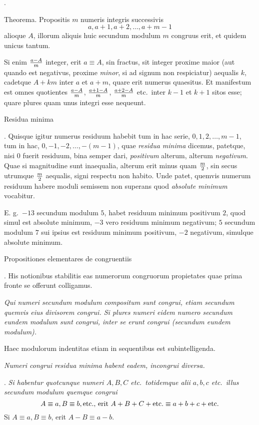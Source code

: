 .

\proclaim Theorema. Propositis $m$ numeris integris successivis
$$ a, a+1, a+2, \ldots, a+m-1$$
alioque $A$, illorum aliquis huic secundum modulum $m$ congruus erit, et quidem unicus tantum.

Si enim ${a-A\over m}$ integer, erit $a\equiv A$, sin fractus, sit integer proxime maior (aut quando est negativus, proxime {\it minor}, si ad signum non respiciatur) aequalis $k$, cadetque $A+km$ inter $a$ et $a+m$, quare erit numerus quaesitus. Et manifestum est omnes quotientes ${a-A \over m}$, ${a+1-A\over m}$, ${a+2-A\over m}$ etc.\ inter $k-1$ et $k+1$ sitos esse; quare plures quam unus integri esse nequeunt.

\ssection Residua minima

. Quisque igitur numerus residuum habebit tum in hac serie, $0,1,2,\ldots,m-1$, tum in hac, $0,-1,-2,\ldots,\allowbreak -(m-1)$, quae {\it residua minima} dicemus, patetque, nisi $0$ fuerit residuum, bina semper dari, {\it positivum} alterum, alterum {\it negativum}. Quae si magnitudine sunt inaequalia, alterum erit minus quam ${m\over 2}$, sin secus utrumque ${m\over 2}$ aequalis, signi respectu non habito. Unde patet, quemvis numerum residuum habere moduli semissem non superans quod {\it absolute minimum} vocabitur.

E. g.\ $-13$ secundum modulum $5$, habet residuum minimum positivum $2$, quod simul est absolute minimum, $-3$ vero residuum minimum negativum; $5$ secundum modulum $7$ sui ipsius est residuum minimum positivum, $-2$ negativum, simulque absolute minimum.

\ssection Propositiones elementares de congruentiis

. His notionibus stabilitis eas numerorum congruorum propietates quae prima fronte se offerunt colligamus.

{\sl Qui numeri secundum modulum compositum sunt congrui, etiam secundum quemvis eius divisorem congrui. Si plures numeri eidem numero secundum eundem modulum sunt congrui, inter se erunt congrui (secundum eundem modulum).}

Haec modulorum indentitas etiam in sequentibus est subintelligenda.

{\sl Numeri congrui residua minima habent eadem, incongrui diversa.}

. {\sl Si habentur quotcunque numeri $A,B,C$ etc.\ totidemque alii $a,b,c$ etc.\ illus secundum modulum quemque congrui
$$A\equiv a, B\equiv b,\hbox{etc., erit}\ A+B+C+\hbox{etc.}\equiv a+b+c+\hbox{etc.}$$}
Si $A\equiv a, B\equiv b$, erit $A-B \equiv a-b$.

